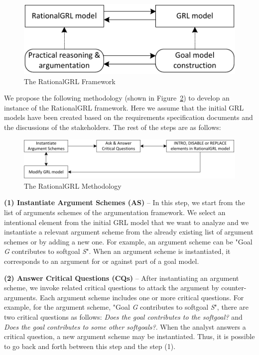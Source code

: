 \begin{figure}[ht]
\centering
\includegraphics[scale=0.4]{img/framework}
\caption{The RationalGRL Framework}
\label{fig:rationalgrl-framework}
\end{figure}

We propose the following methodology (shown in Figure~\ref{fig:rationalgrl-methodology}) to develop an instance of the RationalGRL framework. Here we assume that the initial GRL models have been created based on the requirements specification documents and the discussions of the stakeholders. The rest of the steps are as follows:

\begin{figure}[ht]
\centering
\includegraphics[scale=0.4]{img/methodology}
\caption{The RationalGRL Methodology}
\label{fig:rationalgrl-methodology}
\end{figure}


\textbf{(1) Instantiate Argument Schemes (AS)} -- In this step, we start from the list of arguments schemes of the argumentation framework. We select an intentional element from the initial GRL model that we want to analyze and we instantiate a relevant argument scheme from the already existing list of argument schemes or by adding a new one. For example, an argument scheme can be "Goal \emph{G} contributes to softgoal \emph{S}". When an argument scheme is instantiated, it corresponds to  an argument for or against part of a goal model.

\textbf{(2) Answer Critical Questions (CQs)} -- After instantiating an argument scheme, we invoke related critical questions to attack the argument by counter-arguments.  Each argument scheme includes one or more critical questions. For example, for the argument scheme, "Goal \emph{G} contributes to softgoal \emph{S}", there are two critical questions as follows:  \emph{Does the goal contributes to the softgoal?} and \emph{Does the goal contributes to some other softgoals?}. 
When the analyst answers  a critical question, a new argument scheme may be instantiated.  Thus, it is possible to go back and forth between this step and the step (1).

